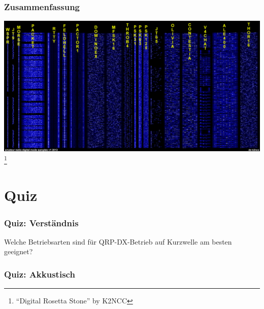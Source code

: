 \begin{frame}
    \frametitle{Zusammenfassung}

    \begin{center}
        \includegraphics[width=.85\textwidth,height=.85\textheight,keepaspectratio]{e16/Digital_Rosetta_Stone.jpg}
        \footnote{``Digital Rosetta Stone'' by K2NCC}
    \end{center}

\end{frame}

\section{Quiz}

\begin{frame}
    \frametitle{Quiz: Verständnis}

    \begin{exampleblock}{Welche Betriebsarten sind für QRP-DX-Betrieb auf Kurzwelle am
    besten geeignet?}
    \end{exampleblock}



\end{frame}

\begin{frame}
    \frametitle{Quiz: Akkustisch}

\end{frame}

